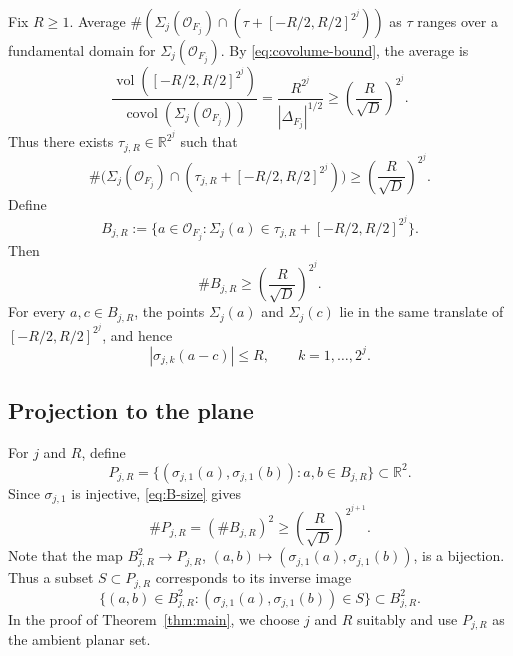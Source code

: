 Fix \(R\ge1\).
Average \(\#(\Sigma_j(\mathcal O_{F_j})\cap(\tau+[-R/2,R/2]^{2^j}))\) as \(\tau\) ranges over a fundamental domain for \(\Sigma_j(\mathcal O_{F_j})\).
By \eqref{eq:covolume-bound}, the average is
\[
\frac{\operatorname{vol}([-R/2,R/2]^{2^j})}{\operatorname{covol}(\Sigma_j(\mathcal O_{F_j}))}
=\frac{R^{2^j}}{|\Delta_{F_j}|^{1/2}}
\ge\left(\frac{R}{\sqrt D}\right)^{2^j}.
\]
Thus there exists \(\tau_{j,R}\in\mathbb R^{2^j}\) such that
\[
\#\bigl(\Sigma_j(\mathcal O_{F_j})\cap(\tau_{j,R}+[-R/2,R/2]^{2^j})\bigr)
\ge
\left(\frac{R}{\sqrt D}\right)^{2^j}.
\]
Define
\begin{equation}\label{eq:B-def}
B_{j,R}
:=
\{a\in\mathcal O_{F_j}:\Sigma_j(a)\in\tau_{j,R}+[-R/2,R/2]^{2^j}\}.
\end{equation}
Then
\begin{equation}\label{eq:B-size}
\#B_{j,R}\ge\left(\frac{R}{\sqrt D}\right)^{2^j}.
\end{equation}
For every \(a,c\in B_{j,R}\), the points \(\Sigma_j(a)\) and \(\Sigma_j(c)\) lie in the same translate of \([-R/2,R/2]^{2^j}\), and hence
\begin{equation}\label{eq:B-diff}
|\sigma_{j,k}(a-c)|\le R,
\qquad
k=1,\ldots,2^j.
\end{equation}

\subsection{Projection to the plane}
\label{subsec:projection-to-plane}

For \(j\) and \(R\), define
\begin{equation}\label{eq:P-def}
P_{j,R}
=
\{(\sigma_{j,1}(a),\sigma_{j,1}(b)):a,b\in B_{j,R}\}
\subset\mathbb R^2.
\end{equation}
Since \(\sigma_{j,1}\) is injective, \eqref{eq:B-size} gives
\begin{equation}\label{eq:P-size}
\#P_{j,R}=(\#B_{j,R})^2
\ge
\left(\frac{R}{\sqrt D}\right)^{2^{j+1}}.
\end{equation}
Note that the map \(B_{j,R}^2\to P_{j,R}\), \((a,b)\mapsto(\sigma_{j,1}(a),\sigma_{j,1}(b))\), is a bijection.
Thus a subset \(S\subset P_{j,R}\) corresponds to its inverse image
\begin{equation}\label{eq:S-lift}
\{(a,b)\in B_{j,R}^2:(\sigma_{j,1}(a),\sigma_{j,1}(b))\in S\}
\subset B_{j,R}^2.
\end{equation}
In the proof of Theorem~\ref{thm:main}, we choose \(j\) and \(R\) suitably and use \(P_{j,R}\) as the ambient planar set.

